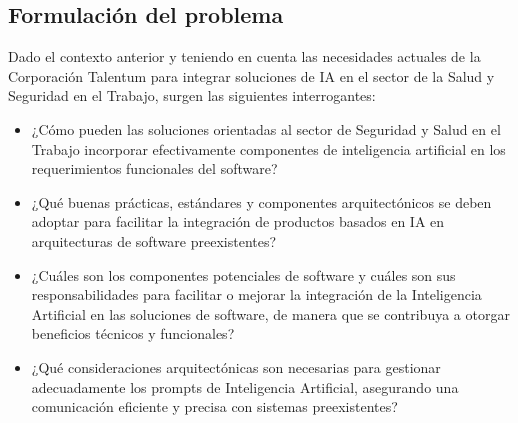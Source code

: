 \subsection{Formulación del problema}

Dado el contexto anterior y teniendo en cuenta las necesidades actuales de la Corporación Talentum para integrar soluciones de IA en el sector de la Salud y Seguridad en el Trabajo, surgen las siguientes interrogantes:
\begin{itemize}
    \item ¿Cómo pueden las soluciones orientadas al sector de Seguridad y Salud en el Trabajo incorporar efectivamente componentes de inteligencia artificial en los requerimientos funcionales del software?
    \item ¿Qué buenas prácticas, estándares y componentes arquitectónicos se deben adoptar para facilitar la integración de productos basados en IA en arquitecturas de software preexistentes?
    \item ¿Cuáles son los componentes potenciales de software y cuáles son sus responsabilidades para facilitar o mejorar la integración de la Inteligencia Artificial en las soluciones de software, de manera que se contribuya a otorgar beneficios técnicos y funcionales?
    \item ¿Qué consideraciones arquitectónicas son necesarias para gestionar adecuadamente los prompts de Inteligencia Artificial, asegurando una comunicación eficiente y precisa con sistemas preexistentes?
\end{itemize}

